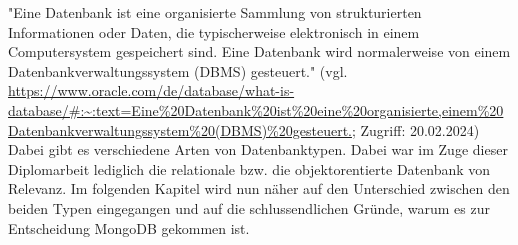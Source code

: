 "Eine Datenbank ist eine organisierte Sammlung von strukturierten Informationen oder Daten, die typischerweise elektronisch in einem Computersystem gespeichert sind. Eine Datenbank wird normalerweise von einem Datenbankverwaltungssystem (DBMS) gesteuert."
\newline
(vgl. \url{https://www.oracle.com/de/database/what-is-database/#:~:text=Eine%20Datenbank%20ist%20eine%20organisierte,einem%20Datenbankverwaltungssystem%20(DBMS)%20gesteuert.}; Zugriff: 20.02.2024)
\newline
Dabei gibt es verschiedene Arten von Datenbanktypen. Dabei war im Zuge dieser Diplomarbeit lediglich die relationale bzw. die objektorentierte Datenbank von Relevanz. Im folgenden Kapitel wird nun näher auf den Unterschied zwischen den beiden Typen eingegangen und auf die schlussendlichen Gründe, warum es zur Entscheidung MongoDB gekommen ist.
\cite{database_basics}